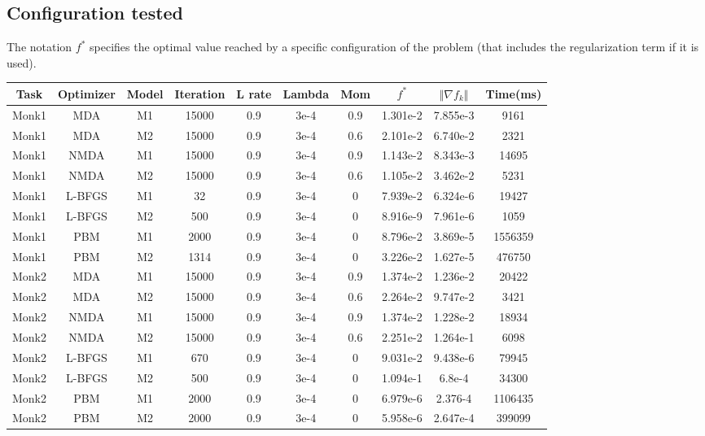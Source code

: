 \subsection{Configuration tested}
The notation $f^*$ specifies the optimal value reached by a specific configuration of the problem (that includes the regularization term if it is used). 

\begin{center}
	\small\addtolength{\tabcolsep}{-3pt}
		\centering
		\begin{longtable}{|c|c|c|c|c|c|c|c|c|c|}
			\hline
			\textbf{Task}& \textbf{Optimizer}&\textbf{Model}&\textbf{Iteration} & \textbf{L rate} & \multicolumn{1}{l|}{\textbf{Lambda}} & \textbf{Mom} & \textbf{$f^{*}$}& \textbf{$\Vert \nabla f_{k}\Vert$ }& \textbf{Time(ms)}\\ \hline 
			Monk1 & MDA & M1 & 15000 & 0.9 & 3e-4  & 0.9 & 1.301e-2  & 7.855e-3 & 9161 \\
			Monk1 & MDA & M2 & 15000 & 0.9 & 3e-4  & 0.6 & 2.101e-2 & 6.740e-2 &  2321\\
			Monk1 & NMDA & M1 & 15000 & 0.9 & 3e-4  & 0.9 & 1.143e-2 & 8.343e-3 & 14695 \\
			Monk1 & NMDA & M2 & 15000 & 0.9 & 3e-4  & 0.6 & 1.105e-2 & 3.462e-2 & 5231 \\
			Monk1 & L-BFGS & M1 & 32 & 0.9 & 3e-4  & 0 &  7.939e-2 & 6.324e-6 & 19427  \\
			Monk1 & L-BFGS & M2 & 500 & 0.9 & 3e-4  & 0 &  8.916e-9 & 7.961e-6 & 1059 \\
			Monk1 & PBM & M1 & 2000 & 0.9 & 3e-4  & 0 & 8.796e-2  & 3.869e-5 & 1556359 \\
			Monk1 & PBM & M2 & 1314 & 0.9 & 3e-4  & 0 & 3.226e-2 & 1.627e-5 & 476750 \\
			
			Monk2 & MDA & M1 & 15000 & 0.9 & 3e-4  & 0.9 & 1.374e-2 & 1.236e-2 & 20422 \\
			Monk2 & MDA & M2 & 15000 & 0.9 & 3e-4  & 0.6 & 2.264e-2 & 9.747e-2 & 3421 \\
			Monk2 & NMDA & M1 & 15000 & 0.9 & 3e-4  & 0.9 &  1.374e-2 & 1.228e-2 & 18934  \\
			Monk2 & NMDA & M2 & 15000 & 0.9 & 3e-4  & 0.6 & 2.251e-2 & 1.264e-1 & 6098 \\
			Monk2 & L-BFGS & M1 & 670 & 0.9 & 3e-4  & 0 & 9.031e-2 & 9.438e-6 & 79945 \\
			Monk2 & L-BFGS & M2 & 500 & 0.9 & 3e-4  & 0 & 1.094e-1 & 6.8e-4 & 34300 \\
			Monk2 & PBM & M1 & 2000 & 0.9 & 3e-4  & 0 & 6.979e-6 & 2.376-4 & 1106435 \\
			Monk2 & PBM & M2 & 2000 & 0.9 & 3e-4  & 0 & 5.958e-6 & 2.647e-4 & 399099 \\
			

\end{longtable}
\end{center}
